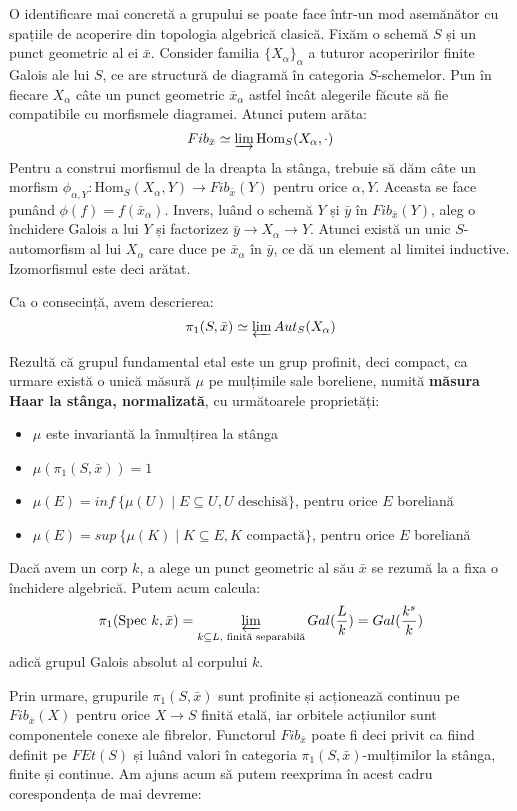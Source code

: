 \documentclass[13pt,openany,oneside]{book}
\begin{document}
O identificare mai concretă a grupului se poate face într-un mod asemănător cu spațiile de acoperire din topologia algebrică clasică. Fixăm o schemă $S$ și un punct geometric al ei $\bar{x}$. Consider familia $\{X_\alpha\}_\alpha$ a tuturor acoperirilor finite Galois ale lui $S$, ce are structură de diagramă în categoria $S$-schemelor. Pun în fiecare $X_\alpha$ câte un punct geometric $\bar{x}_\alpha$ astfel încât alegerile făcute să fie compatibile cu morfismele diagramei. Atunci putem arăta:
$$Fib_{\bar{x}} \simeq \varinjlim \text{Hom}_S(X_\alpha,\cdot)$$
Pentru a construi morfismul de la dreapta la stânga, trebuie să dăm câte un morfism $\phi_{\alpha,Y} : \text{Hom}_S(X_\alpha,Y) \rightarrow Fib_{\bar{x}}(Y)$ pentru orice $\alpha,Y$. Aceasta se face punând $\phi(f)=f(\bar{x}_\alpha)$. Invers, luând o schemă $Y$ și $\bar{y}$ în $Fib_{\bar{x}}(Y)$, aleg o închidere Galois a lui $Y$ și factorizez $\bar{y} \rightarrow X_\alpha \rightarrow Y$. Atunci există un unic $S$-automorfism al lui $X_\alpha$ care duce pe $\bar{x}_\alpha$ în $\bar{y}$, ce dă un element al limitei inductive. Izomorfismul este deci arătat.

Ca o consecință, avem descrierea:
$$\pi_1(S,\bar{x}) \simeq \varprojlim Aut_S(X_\alpha)$$

Rezultă că grupul fundamental etal este un grup profinit, deci compact, ca urmare există o unică măsură $\mu$ pe mulțimile sale boreliene, numită {\bf măsura Haar la stânga, normalizată}, cu următoarele proprietăți:
\begin{itemize}
\item $\mu$ este invariantă la înmulțirea la stânga
\item $\mu(\pi_1(S,\bar{x}))=1$
\item $\mu(E) = inf\ \{\mu(U) \mid E \subseteq U, U \text{ deschisă}\}$, pentru orice $E$ boreliană
\item $\mu(E) = sup\ \{\mu(K) \mid K \subseteq E, K \text{ compactă}\}$, pentru orice $E$ boreliană
\end{itemize}

\begin{ex}
Dacă avem un corp $k$, a alege un punct geometric al său $\bar{x}$ se rezumă la a fixa o închidere algebrică. Putem acum calcula:
$$\pi_1(\text{Spec }k,\bar{x})=\varprojlim\limits_{k \subseteq L \text{, finită separabilă}} Gal(\frac{L}{k}) = Gal(\frac{k^s}{k})$$
adică grupul Galois absolut al corpului $k$.
\end{ex}

Prin urmare, grupurile $\pi_1(S,\bar{x})$ sunt profinite și acționează continuu pe $Fib_{\bar{x}}(X)$ pentru orice $X \rightarrow S$ finită etală, iar orbitele acțiunilor sunt componentele conexe ale fibrelor. Functorul $Fib_{\bar{x}}$ poate fi deci privit ca fiind definit pe $FEt(S)$ și luând valori în categoria $\pi_1(S,\bar{x})$-mulțimilor la stânga, finite și continue. Am ajuns acum să putem reexprima în acest cadru corespondența de mai devreme:
\end{document}
